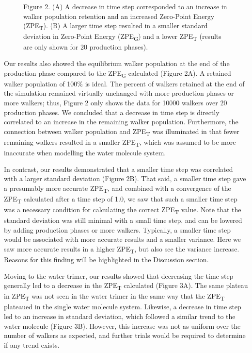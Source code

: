 \documentclass[journal=jacsat,manuscript=article]{achemso}
\begin{document}
\begin{figure}[H]
\begin{subfigure}{.5\textwidth}
\end{subfigure}
\caption{Figure 2. (A) A decrease in time step corresponded to an increase in walker population retention and an increased Zero-Point Energy (ZPE\textsubscript{T}).
(B) A larger time step resulted in a smaller standard deviation in Zero-Point Energy (ZPE\textsubscript{G}) and a lower ZPE\textsubscript{T} (results are only shown for 20 production phases).}
\end{figure}

Our results also showed the equilibrium walker population at the end of the production phase compared to the ZPE\textsubscript{G} calculated (Figure 2A). A retained walker population of 100\% is ideal. The percent of walkers retained at the end of the simulation remained virtually unchanged with more production phases or more walkers; thus, Figure 2 only shows the data for 10000 walkers over 20 production phases. We concluded that a decrease in time step is directly correlated to an increase in the remaining walker population. Furthermore, the connection between walker population and ZPE\textsubscript{T} was illuminated in that fewer remaining walkers resulted in a smaller ZPE\textsubscript{T}, which was assumed to be more inaccurate when modelling the water molecule system. 

In contrast, our results demonstrated that a smaller time step was correlated with a larger standard deviation (Figure 2B). That said, a smaller time step gave a presumably more accurate ZPE\textsubscript{T}, and combined with a convergence of the ZPE\textsubscript{T} calculated after a time step of 1.0, we saw that such a smaller time step was a necessary condition for calculating the correct ZPE\textsubscript{T} value. Note that the standard deviation was still minimal with a small time step, and can be lowered by adding production phases or more walkers. Typically, a smaller time step would be associated with more accurate results and a smaller variance. Here we saw more accurate results in a higher ZPE\textsubscript{T}, but also see the variance increase. Reasons for this finding will be highlighted in the Discussion section.

Moving to the water trimer, our results showed that decreasing the time step generally led to a decrease in the ZPE\textsubscript{T} calculated (Figure 3A). The same plateau in ZPE\textsubscript{T} was not seen in the water trimer in the same way that the ZPE\textsubscript{T} plateaued in the single water molecule system. Likewise, a decrease in time step led to an increase in standard deviation, which followed a similar trend to the water molecule (Figure 3B). However, this increase was not as uniform over the number of walkers as expected, and further trials would be required to determine if any trend exists. 
\end{document}
